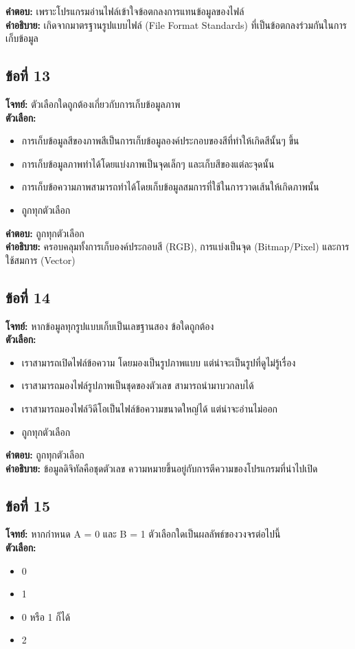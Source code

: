 \documentclass[12pt]{article}
\begin{document}
\textbf{คำตอบ:} เพราะโปรแกรมอ่านไฟล์เข้าใจข้อตกลงการแทนข้อมูลของไฟล์\\
\textbf{คำอธิบาย:} เกิดจากมาตรฐานรูปแบบไฟล์ (File Format Standards) ที่เป็นข้อตกลงร่วมกันในการเก็บข้อมูล

\subsection*{ข้อที่ 13}
\textbf{โจทย์:} ตัวเลือกใดถูกต้องเกี่ยวกับการเก็บข้อมูลภาพ\\
\textbf{ตัวเลือก:}
\begin{itemize}
    \item การเก็บข้อมูลสีของภาพสีเป็นการเก็บข้อมูลองค์ประกอบของสีที่ทำให้เกิดสีนั้นๆ ขึ้น
    \item การเก็บข้อมูลภาพทำได้โดยแบ่งภาพเป็นจุดเล็กๆ และเก็บสีของแต่ละจุดนั้น
    \item การเก็บข้อความภาพสามารถทำได้โดยเก็บข้อมูลสมการที่ใช้ในการวาดเส้นให้เกิดภาพนั้น
    \item ถูกทุกตัวเลือก
\end{itemize}

\textbf{คำตอบ:} ถูกทุกตัวเลือก\\
\textbf{คำอธิบาย:} ครอบคลุมทั้งการเก็บองค์ประกอบสี (RGB), การแบ่งเป็นจุด (Bitmap/Pixel) และการใช้สมการ (Vector)

\subsection*{ข้อที่ 14}
\textbf{โจทย์:} หากข้อมูลทุกรูปแบบเก็บเป็นเลขฐานสอง ข้อใดถูกต้อง\\
\textbf{ตัวเลือก:}
\begin{itemize}
    \item เราสามารถเปิดไฟล์ข้อความ โดยมองเป็นรูปภาพแบบ แต่น่าจะเป็นรูปที่ดูไม่รู้เรื่อง
    \item เราสามารถมองไฟล์รูปภาพเป็นชุดของตัวเลข สามารถนำมาบวกลบได้
    \item เราสามารถมองไฟล์วิดีโอเป็นไฟล์ข้อความขนาดใหญ่ได้ แต่น่าจะอ่านไม่ออก
    \item ถูกทุกตัวเลือก
\end{itemize}

\textbf{คำตอบ:} ถูกทุกตัวเลือก\\
\textbf{คำอธิบาย:} ข้อมูลดิจิทัลคือชุดตัวเลข ความหมายขึ้นอยู่กับการตีความของโปรแกรมที่นำไปเปิด

\subsection*{ข้อที่ 15}
\textbf{โจทย์:} หากกำหนด A = 0 และ B = 1 ตัวเลือกใดเป็นผลลัพธ์ของวงจรต่อไปนี้\\
\textbf{ตัวเลือก:}
\begin{itemize}
    \item 0
    \item 1
    \item 0 หรือ 1 ก็ได้
    \item 2
\end{itemize}
\end{document}
